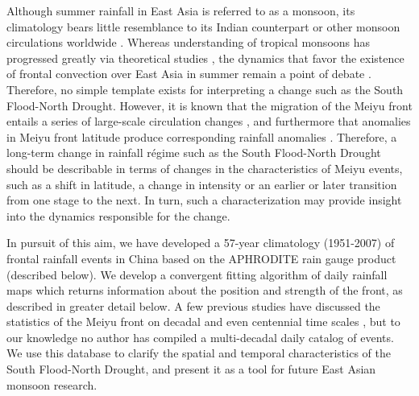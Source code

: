 \documentclass[draft,grl]{AGUTeX}
\begin{document}
\begin{article}
	Although summer rainfall in East Asia is referred to as a monsoon, its climatology bears little resemblance to its Indian counterpart or other monsoon circulations worldwide \citep{Ding2005}. Whereas understanding of tropical monsoons has progressed greatly via theoretical studies \citep{Plumb1992,Prive2007,Bordoni2008}, the dynamics that favor the existence of frontal convection over East Asia in summer remain a point of debate \citep{Sampe2010,Chen2014}. Therefore, no simple template exists for interpreting a change such as the South Flood-North Drought. However, it is known that the migration of the Meiyu front entails a series of large-scale circulation changes \citep{Chen2004}, and furthermore that anomalies in Meiyu front latitude produce corresponding rainfall anomalies \citep{Kosaka2011}. Therefore, a long-term change in rainfall r\'egime such as the South Flood-North Drought should be describable in terms of changes in the characteristics of Meiyu events, such as a shift in latitude, a change in intensity or an earlier or later transition from one stage to the next. In turn, such a characterization may provide insight into the dynamics responsible for the change.
	
	In pursuit of this aim, we have developed a 57-year climatology (1951-2007) of frontal rainfall events in China based on the APHRODITE rain gauge product (described below). We develop a convergent fitting algorithm of daily rainfall maps which returns information about the position and strength of the front, as described in greater detail below. A few previous studies have discussed the statistics of the Meiyu front on decadal and even centennial time scales \citep{Chen2004,Ge2008,Xu2009}, but to our knowledge no author has compiled a multi-decadal daily catalog of events. We use this database to clarify the spatial and temporal characteristics of the South Flood-North Drought, and present it as a tool for future East Asian monsoon research.
		

\end{article}
\end{document}
